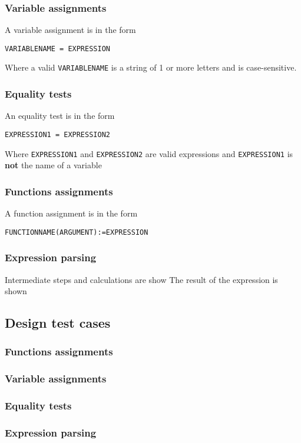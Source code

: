 \documentclass[11pt,a4paper]{article}
\begin{document}
\subsubsection{Variable assignments}
\label{sec:orgheadline4}
A variable assignment is in the form

\texttt{VARIABLENAME = EXPRESSION}

Where a valid \texttt{VARIABLENAME} is a string of 1 or more letters and
is case-sensitive.
\subsubsection{Equality tests}
\label{sec:orgheadline5}
An equality test is in the form

\texttt{EXPRESSION1 = EXPRESSION2}

Where \texttt{EXPRESSION1} and \texttt{EXPRESSION2} are valid expressions and
\texttt{EXPRESSION1} is \textbf{not} the name of a variable

\subsubsection{Functions assignments}
\label{sec:orgheadline6}
A function assignment is in the form

\texttt{FUNCTIONNAME(ARGUMENT):=EXPRESSION}
\subsubsection{Expression parsing}
\label{sec:orgheadline7}
Intermediate steps and calculations are show
The result of the expression is shown
\subsection{Design test cases}
\label{sec:orgheadline13}
\subsubsection{Functions assignments}
\label{sec:orgheadline9}
\subsubsection{Variable assignments}
\label{sec:orgheadline10}
\subsubsection{Equality tests}
\label{sec:orgheadline11}
\subsubsection{Expression parsing}
\label{sec:orgheadline12}
\end{document}
